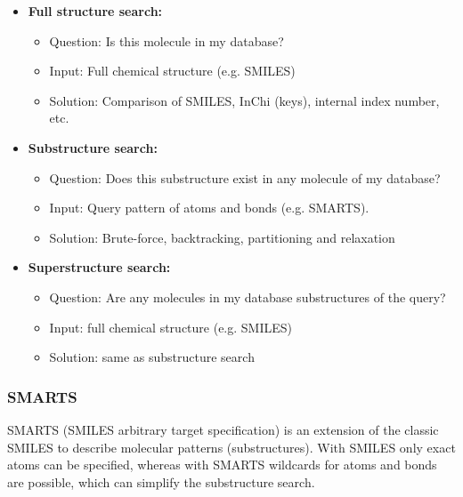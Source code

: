 \begin{itemize}
    \item \textbf{Full structure search:}
    \begin{itemize}
        \item Question: Is this molecule in my database?
        \item Input: Full chemical structure (e.g. SMILES)
        \item Solution: Comparison of SMILES, InChi (keys), internal index number, etc.
    \end{itemize}
    \item \textbf{Substructure search:}
    \begin{itemize}
        \item Question: Does this substructure exist in any molecule of my database?
        \item Input: Query pattern of atoms and bonds (e.g. SMARTS).
        \item Solution: Brute-force, backtracking, partitioning and relaxation
    \end{itemize}
    \item \textbf{Superstructure search:}
    \begin{itemize}
        \item Question: Are any molecules in my database substructures of the query?
        \item Input: full chemical structure (e.g. SMILES)
        \item Solution: same as substructure search
    \end{itemize}
\end{itemize}

\subsubsection{SMARTS}

SMARTS (SMILES arbitrary target specification) is an extension of the classic SMILES to describe molecular patterns (substructures). With SMILES only exact atoms can be specified, whereas with SMARTS wildcards for atoms and bonds are possible, which can simplify the substructure search.

